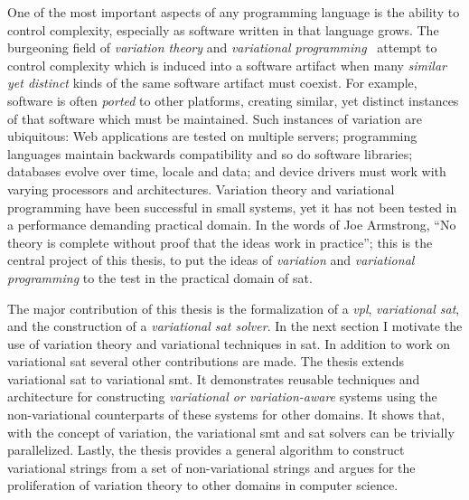 One of the most important aspects of any programming language is the ability to
control complexity, especially as software written in that language grows. The
burgeoning field of \emph{variation theory} and \emph{variational
  programming}~\cite{EW11gttse,EW11tosem,HW16fosd,CEW16ecoop,Walk14onward}
attempt to control complexity which is induced into a software artifact when
many \emph{similar yet distinct} kinds of the same software artifact must
coexist. For example, software is often \emph{ported} to other platforms,
creating similar, yet distinct instances of that software which must be
maintained. Such instances of variation are ubiquitous: Web applications are
tested on multiple servers; programming languages maintain backwards
compatibility and so do software libraries; databases evolve over time, locale
and data; and device drivers must work with varying processors and
architectures. Variation theory and variational programming have been successful
in small systems, yet it has
not been tested in a performance demanding practical domain. In the words of Joe
Armstrong\cite{armstrongThesis}, ``No theory is complete without proof that the
ideas work in practice''; this is the central project of this thesis, to put the
ideas of \emph{variation} and \emph{variational programming} to the test in the
practical domain of \ac{sat}.

The major contribution of this thesis is the formalization of a \emph{\ac{vpl}},
\emph{variational \acl{sat}}, and the construction of a \emph{variational
  \ac{sat} solver}. In the next section I motivate the use of variation theory
and variational techniques in \acl{sat}. In addition to work on variational
\ac{sat} several other contributions are made. The thesis extends variational
\acl{sat} to variational \ac{smt}. It demonstrates reusable techniques and
architecture for constructing \emph{variational or variation-aware} systems
using the non-variational counterparts of these systems for other domains. It
shows that, with the concept of variation, the variational \ac{smt} and \ac{sat}
solvers can be trivially parallelized. Lastly, the thesis provides a general
algorithm to construct variational strings from a set of non-variational strings
and argues for the proliferation of variation theory to other domains in
computer science.


